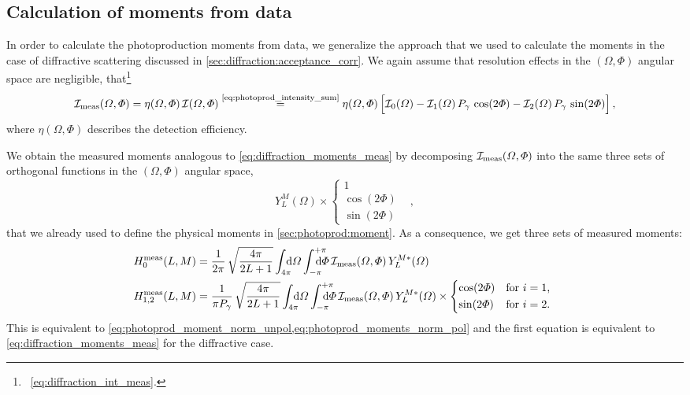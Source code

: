 \subsection{Calculation of moments from data}%
\label{sec:photoprod:moments_data}

In order to calculate the photoproduction moments from data, we
generalize the approach that we used to calculate the moments in the
case of diffractive scattering discussed in
\cref{sec:diffraction:acceptance_corr}.  We again assume that
resolution effects in the $(\Omega, \Phi)$ angular space are
negligible, \ie that\footnote{\Confer\
\cref{eq:diffraction_int_meas}.}
\begin{equation}
  \label{eq:photoprod_intensity_meas}
  \intensity_\text{meas}(\Omega, \Phi)
  = \eta(\Omega, \Phi)\, \intensity(\Omega, \Phi)
  \equalUsing{\cref{eq:photoprod_intensity_sum}} \eta(\Omega, \Phi) \sBrk[2]{\intensity_0(\Omega)
  - \intensity_1(\Omega)\, P_\gamma\, \cos(2 \Phi)
  - \intensity_2(\Omega)\, P_\gamma\, \sin(2 \Phi)},
\end{equation}
where $\eta(\Omega, \Phi)$ describes the detection efficiency.

We obtain the measured moments analogous to
\cref{eq:diffraction_moments_meas} by decomposing
$\mathcal{I}_\text{meas}(\Omega, \Phi)$ into the same three sets of
orthogonal functions in the $(\Omega, \Phi)$ angular space, \ie
\begin{equation}
  Y_L^M(\Omega) \times \begin{cases}
    1 & \\
    \cos(2 \Phi) & \\
    \sin(2 \Phi) &
  \end{cases},
\end{equation}
that we already used to define the physical moments in
\cref{sec:photoprod:moment}.  As a consequence, we get three sets of
measured moments:
\begin{align}
  \label{eq:photoprod_moment_meas_unpol}
  H_0^\text{meas}(L, M)
  ={}& \frac{1}{2 \pi}\, \sqrt{\frac{4 \pi}{2 L + 1}} \int_{4 \pi}\!\!\!\! \dif{\Omega} \int_{-\pi}^{+\pi}\hspace{-1.2em} \dif{\Phi}\,
  \intensity_\text{meas}(\Omega, \Phi)\, Y_L^{M *}(\Omega)
  \\
  \label{eq:photoprod_moments_meas_pol}
  H_{1, 2}^\text{meas}(L, M)
  ={}& \frac{1}{\pi P_\gamma}\, \sqrt{\frac{4 \pi}{2 L + 1}} \int_{4 \pi}\!\!\!\! \dif{\Omega} \int_{-\pi}^{+\pi}\hspace{-1.2em} \dif{\Phi}\,
  \intensity_\text{meas}(\Omega, \Phi)\, Y_L^{M *}(\Omega) \times \begin{cases*}
    \cos(2 \Phi) & for $i = 1$, \\
    \sin(2 \Phi) & for $i = 2$.
  \end{cases*}
\end{align}
This is equivalent to
\cref{eq:photoprod_moment_norm_unpol,eq:photoprod_moments_norm_pol}
and the first equation is equivalent to
\cref{eq:diffraction_moments_meas} for the diffractive case.

